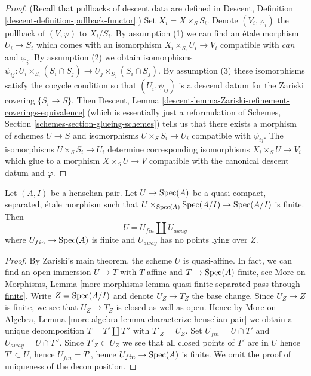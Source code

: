 \begin{proof}
(Recall that pullbacks of descent data are defined in
Descent, Definition \ref{descent-definition-pullback-functor}.)
Set $X_i = X \times_S S_i$. Denote $(V_i, \varphi_i)$ the pullback
of $(V, \varphi)$ to $X_i/S_i$.
By assumption (1) we can find an \'etale morphism $U_i \to S_i$
which comes with an isomorphism $X_i \times_{S_i} U_i \to V_i$ compatible with
$can$ and $\varphi_i$. By assumption (2) we obtain isomorphisms
$\psi_{ij} : U_i \times_{S_i} (S_i \cap S_j) \to
U_j \times_{S_j} (S_i \cap S_j)$.
By assumption (3) these isomorphisms satisfy the cocycle condition
so that $(U_i, \psi_{ij})$ is a descend datum for the
Zariski covering $\{S_i \to S\}$. Then Descent, Lemma
\ref{descent-lemma-Zariski-refinement-coverings-equivalence}
(which is essentially just a reformulation of
Schemes, Section \ref{schemes-section-glueing-schemes})
tells us that there exists a morphism of schemes $U \to S$
and isomorphisms $U \times_S S_i \to U_i$ compatible
with $\psi_{ij}$. The isomorphisms $U \times_S S_i \to U_i$
determine corresponding isomorphisms $X_i \times_S U \to V_i$
which glue to a morphism $X \times_S U \to V$ compatible
with the canonical descent datum and $\varphi$.
\end{proof}

\begin{lemma}
\label{lemma-split-henselian}
Let $(A, I)$ be a henselian pair. Let $U \to \mathop{\mathrm{Spec}}(A)$ be a
quasi-compact, separated, \'etale morphism such that
$U \times_{\mathop{\mathrm{Spec}}(A)} \mathop{\mathrm{Spec}}(A/I) \to \mathop{\mathrm{Spec}}(A/I)$ is finite.
Then
$$
U = U_{fin} \amalg U_{away}
$$
where $U_{fin} \to \mathop{\mathrm{Spec}}(A)$ is finite and $U_{away}$ has
no points lying over $Z$.
\end{lemma}

\begin{proof}
By Zariski's main theorem, the scheme $U$ is quasi-affine.
In fact, we can find an open immersion $U \to T$ with $T$ affine and
$T \to \mathop{\mathrm{Spec}}(A)$ finite, see More on Morphisms, Lemma
\ref{more-morphisms-lemma-quasi-finite-separated-pass-through-finite}.
Write $Z = \mathop{\mathrm{Spec}}(A/I)$ and denote $U_Z \to T_Z$ the base change.
Since $U_Z \to Z$ is finite, we see that $U_Z \to T_Z$ is closed
as well as open. Hence by
More on Algebra, Lemma \ref{more-algebra-lemma-characterize-henselian-pair}
we obtain a unique decomposition $T = T' \amalg T''$ with $T'_Z = U_Z$.
Set $U_{fin} = U \cap T'$ and $U_{away} = U \cap T''$. Since
$T'_Z \subset U_Z$ we see that all closed points of $T'$ are in $U$
hence $T' \subset U$, hence $U_{fin} = T'$, hence $U_{fin} \to \mathop{\mathrm{Spec}}(A)$
is finite. We omit the proof
of uniqueness of the decomposition.
\end{proof}

